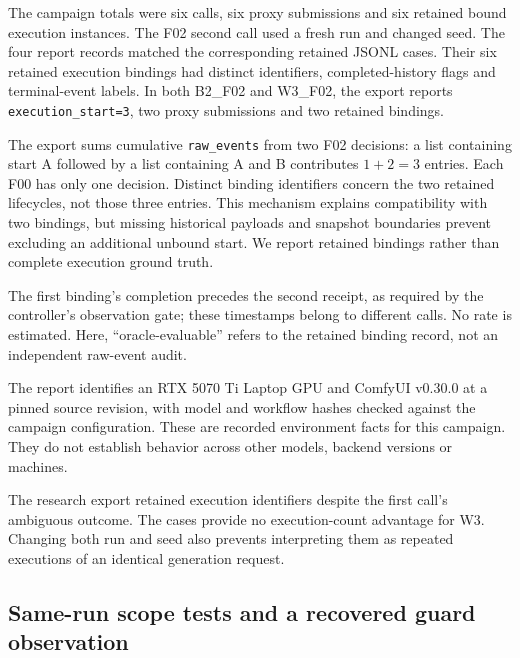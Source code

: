\documentclass[conference,letterpaper,10pt]{IEEEtran}
\begin{document}
\begin{table}[t]
\caption{Four fixed cases, checked against retained report fields. S/E are
proxy submissions/bound execution instances; U/R are unresolved/resolved
research-client calls. All four cases were oracle-evaluable.}
\label{tab:cases}
\centering

\end{table}

The campaign totals were six calls, six proxy submissions and six retained bound
execution instances. The F02 second call used a fresh run and changed seed.
The four report records matched the corresponding retained JSONL cases.
Their six retained execution bindings had distinct identifiers, completed-history
flags and terminal-event labels. In both B2\_F02 and W3\_F02, the export reports
\texttt{execution\_start=3}, two proxy submissions and two retained bindings.

The export sums cumulative \texttt{raw\_events} from two F02 decisions: a
list containing start A followed by a list containing A and B contributes
$1+2=3$ entries. Each F00 has only one decision. Distinct binding identifiers
concern the two retained lifecycles, not those three entries. This mechanism
explains compatibility with two bindings, but missing historical payloads and
snapshot boundaries prevent excluding an additional unbound start. We report
retained bindings rather than complete execution ground truth.

The first binding's completion precedes the second
receipt, as required by the controller's observation gate; these timestamps
belong to different calls. No rate is estimated. Here, ``oracle-evaluable''
refers to the retained binding record, not an independent raw-event audit.

The report identifies an RTX 5070 Ti Laptop GPU and ComfyUI v0.30.0 at a pinned source revision, with model and workflow hashes
checked against the campaign configuration. These are recorded environment
facts for this campaign. They do not establish behavior across other models,
backend versions or machines.

The research export retained execution identifiers despite the first call's
ambiguous outcome. The cases provide no execution-count advantage for
W3. Changing both run and seed also prevents interpreting them as repeated
executions of an identical generation request.

\subsection{Same-run scope tests and a recovered guard observation}
\end{document}
